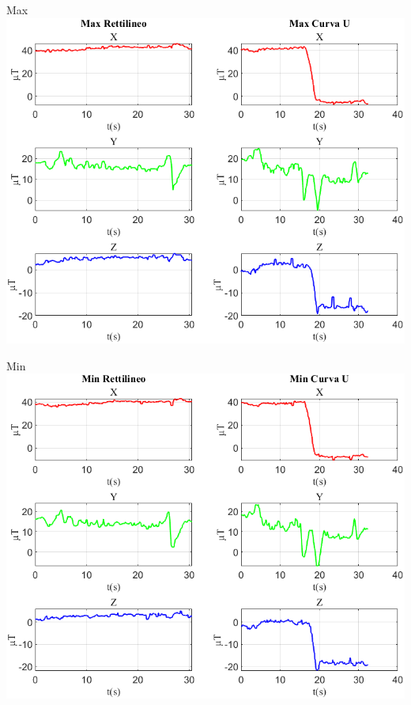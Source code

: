 \documentclass[beamer]{standalone}
\begin{document}
	\begin{frame}{{Max}}
		\centering\includegraphics[height=.8\textheight]{figure/Mag/Max}
	\end{frame}
	
	\begin{frame}{{Min}}
		\centering\includegraphics[height=.8\textheight]{figure/Mag/Min}
	\end{frame}
	
\end{document}
